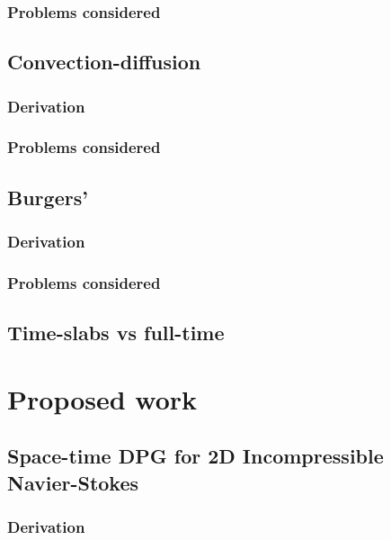\documentclass[12pt]{report}
\begin{document}
\subsection{Problems considered}


\section{Convection-diffusion}

\subsection{Derivation}

\subsection{Problems considered}


\section{Burgers'}

\subsection{Derivation}

\subsection{Problems considered}


\section{Time-slabs vs full-time}



\chapter{Proposed work}



\section{Space-time DPG for 2D Incompressible Navier-Stokes}

\subsection{Derivation}
\end{document}
